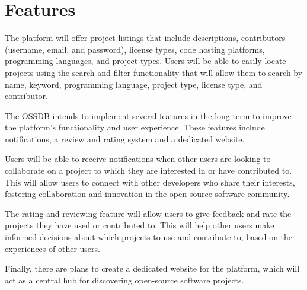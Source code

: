 \pagebreak
\section{Features}
The platform will offer project listings that include descriptions, contributors
(username, email, and password), license types, code hosting platforms,
programming languages, and project types.
Users will be able to easily locate projects using the search and filter functionality that will allow them
to search by name, keyword, programming language, project type, license type, and contributor.

The OSSDB intends to implement several features in the long term to improve the platform's
functionality and user experience.
These features include notifications, a review and rating system and a dedicated website. 

Users will be able to receive notifications when other users are looking to collaborate
on a project to which they are interested in or have contributed to.
This will allow users to connect with other developers who share their interests,
fostering collaboration and innovation in the open-source software community. 

The rating and reviewing feature will allow users to give feedback and rate the
projects they have used or contributed to.
This will help other users make informed decisions about which projects
to use and contribute to, based on the experiences of other users. 

Finally, there are plans to create a dedicated website for the platform,
which will act as a central hub for discovering open-source software projects. 
